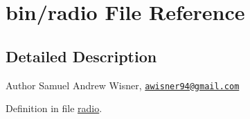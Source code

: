 \hypertarget{radio}{\section{bin/radio File Reference}
\label{radio}
}


\subsection{Detailed Description}
\begin{DoxyAuthor}{Author}
Samuel Andrew Wisner, \href{mailto:awisner94@gmail.com}{\tt awisner94@gmail.\+com} 
\end{DoxyAuthor}


Definition in file \hyperlink{radio_source}{radio}.

